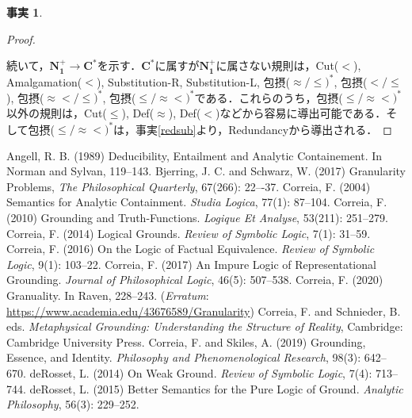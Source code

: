 \documentclass[twoside,14Q,dvipdfmx]{jsarticle}
\theoremstyle{definition}
\newtheorem{fact}{事実}
\begin{document}
\begin{fact}
\begin{proof}
\begin{prooftree}
\end{prooftree}



続いて，$\mathbf{N_{1}^{+}}\longrightarrow\mathbf{C^{*}}$を示す．$\mathbf{C^{*}}$に属すが$\mathbf{N_{1}^{+}}$に属さない規則は，Cut($<$), Amalgamation($<$), Substitution-R, Substitution-L, 包摂($\approx/\leq)^{*}$, 包摂($</\leq$), 包摂($\approx</\leq)^{*}$, 包摂($\leq/\approx<)^{*}$である．これらのうち，包摂($\leq/\approx<)^{*}$以外の規則は，Cut($\leq$), Def($\approx$), Def($<$)などから容易に導出可能である．そして包摂($\leq/\approx<)^{*}$は，事実\ref{redsub}より，Redundancyから導出される．
\end{proof}
\end{fact}

\begin{thebibliography}{99}
 Angell, R. B. (1989) Deducibility, Entailment and Analytic Containement. In Norman and Sylvan\cite{NormanandSylvan1989}, 119--143.
 Bjerring, J. C. and Schwarz, W. (2017) Granularity Problems, \emph{The Philosophical Quarterly}, 67(266): 22–-37. 
 Correia, F. (2004) Semantics for Analytic Containment. \emph{Studia Logica}, 77(1): 87--104.
 Correia, F. (2010) Grounding and Truth-Functions. \emph{Logique Et Analyse}, 53(211): 251--279.
 Correia, F. (2014) Logical Grounds. \emph{Review of Symbolic Logic}, 7(1): 31--59. 
 Correia, F. (2016) On the Logic of Factual Equivalence. \emph{Review of Symbolic Logic}, 9(1): 103--22. 
 Correia, F. (2017) An Impure Logic of Representational Grounding. \emph{Journal of Philosophical Logic}, 46(5): 507--538.
 Correia, F. (2020) Granuality. In Raven\cite{Raven2020}, 228--243. (\emph{Erratum}: \url{https://www.academia.edu/43676589/Granularity})
 Correia, F. and Schnieder, B. eds. \emph{Metaphysical Grounding: Understanding the Structure of Reality}, Cambridge: Cambridge University Press.
 Correia, F. and Skiles, A. (2019) Grounding, Essence, and Identity. \emph{Philosophy and Phenomenological Research}, 98(3): 642--670.
 deRosset, L. (2014) On Weak Ground. \emph{Review of Symbolic Logic}, 7(4): 713--744.
 deRosset, L. (2015) Better Semantics for the Pure Logic of Ground. \emph{Analytic Philosophy}, 56(3): 229--252.

\end{thebibliography}
\end{document}
